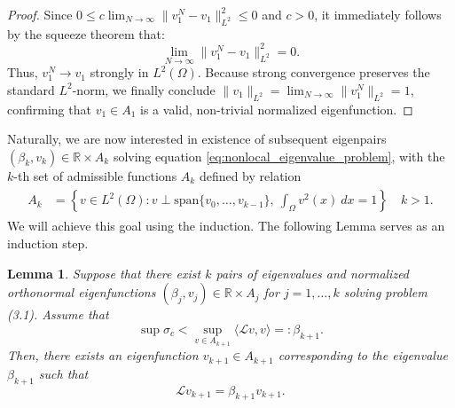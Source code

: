 \documentclass[11pt, a4paper]{article}
\theoremstyle{break}
\theoremstyle{break}
\theoremstyle{break}
\theoremstyle{break}
\theoremstyle{break}
\newtheorem{lem}{Lemma}[section]
\theoremstyle{break}
\theoremstyle{break}
\theoremstyle{break}
\theoremstyle{break}
\begin{document}
\begin{proof}
    Since $0 \leq c \lim_{N \to \infty} \|v_1^N - v_1\|_{L^2}^2 \leq 0$ and $c > 0$, it immediately follows by the squeeze theorem that:
    \begin{equation}
        \lim_{N \to \infty} \|v_1^N - v_1\|_{L^2}^2 = 0.
    \end{equation}
    Thus, $v_1^N \to v_1$ strongly in $L^2(\Omega)$. Because strong convergence preserves the standard $L^2$-norm, we finally conclude $\|v_1\|_{L^2} = \lim_{N \to \infty} \|v_1^N\|_{L^2} = 1$, confirming that $v_1 \in A_1$ is a valid, non-trivial normalized eigenfunction.
\end{proof}

Naturally, we are now interested in existence of subsequent eigenpairs $(\beta_k, v_k) \in \mathbb{R}\times A_k$ solving equation \eqref{eq:nonlocal_eigenvalue_problem}, with the $k$-th set of admissible functions $A_k$ defined by relation
\begin{align}
    \begin{split}
        A_k &= \left\{ v \in L^2(\Omega): v \perp \text{span}\{v_0, \ldots, v_{k-1}\}, \: \int_\Omega v^2(x) \: dx = 1 \right\} \quad k > 1.
    \end{split}
\end{align}
We will achieve this goal using the induction. The following Lemma serves as an induction step.

\begin{lem}
    \label{lem:inductive_step}
    Suppose that there exist $k$ pairs of eigenvalues and normalized orthonormal eigenfunctions $(\beta_j, v_j) \in \mathbb{R} \times A_j$ for $j=1, \ldots, k$ solving problem (3.1). Assume that
    \begin{equation}
        \label{eq:next_beta_inequality}
        \sup \sigma_c < \sup_{v \in A_{k+1}} \langle \mathcal{L}v, v \rangle =: \beta_{k+1}.
    \end{equation}
    Then, there exists an eigenfunction $v_{k+1} \in A_{k+1}$ corresponding to the eigenvalue $\beta_{k+1}$ such that
    \begin{equation}
        \label{eq:next_eigenproblem_solution}
        \mathcal{L}v_{k+1} = \beta_{k+1} v_{k+1}.
    \end{equation}
\end{lem}
\end{document}
